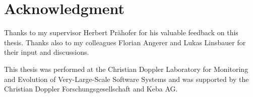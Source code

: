 \chapter{Acknowledgment}

Thanks to my supervisor Herbert Prähofer for his valuable feedback on this thesis. Thanks also to my colleagues Florian 
Angerer and Lukas Linsbauer for their input and discussions.

This thesis was performed at the Christian Doppler Laboratory for Monitoring and Evolution of Very-Large-Scale Software 
Systems and was supported by the Christian Doppler \foreignlanguage{ngerman}{Forschungsgesellschaft} and Keba AG.
